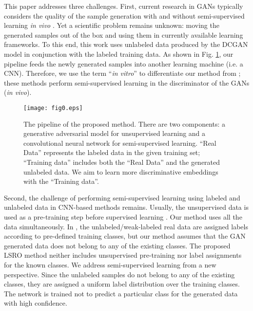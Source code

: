 \documentclass[10pt,twocolumn,letterpaper]{article}
\begin{document}
This paper addresses three challenges. First, current research in GANs typically considers the quality of the sample generation with and without semi-supervised learning \emph{in vivo} \cite{odena2016semi,salimans2016improved,radford2015unsupervised,chen2016infogan,pathak2016context,wu2016learning}. Yet a scientific problem remains unknown: moving the generated samples out of the box and using them in currently available learning frameworks. To this end, this work uses unlabeled data produced by the DCGAN model \cite{radford2015unsupervised} in conjunction with the labeled training data. As shown in Fig. \ref{fig:pipeline}, our pipeline feeds the newly generated samples into another learning machine (i.e. a CNN). Therefore, we use the term ``\emph{in vitro}'' to differentiate our method from \cite{odena2016semi,salimans2016improved,radford2015unsupervised,chen2016infogan}; these methods perform semi-supervised learning in the discriminator of the GANs (\emph{in vivo}).

\begin{figure}[t]
\begin{center}
\texttt{[image: fig0.eps]}
\end{center}
   \caption{The pipeline of the proposed method. There are two components: a generative adversarial model \cite{radford2015unsupervised} for unsupervised learning and a convolutional neural network for semi-supervised learning. ``Real Data'' represents the labeled data in the given training set; ``Training data'' includes both the ``Real Data'' and the generated unlabeled data. We aim to learn more discriminative embeddings with the ``Training data''. }
\label{fig:pipeline}
\end{figure}

Second, the challenge of performing semi-supervised learning using labeled and unlabeled data in CNN-based methods remains. Usually, the unsupervised data is used as a pre-training step before supervised learning \cite{ranzato2008semi,goodfellow2013multi,hinton2006reducing}. Our method uses all the data simultaneously. In \cite{papandreou2015weakly,lee2013pseudo,odena2016semi,salimans2016improved}, the unlabeled/weak-labeled real data are assigned labels according to pre-defined training classes, but our method assumes that the GAN generated data does not belong to any of the existing classes. The proposed LSRO method neither includes unsupervised pre-training nor label assignments for the known classes. We address semi-supervised learning from a new perspective. Since the unlabeled samples do not belong to any of the existing classes, they are assigned a uniform label distribution over the training classes. The network is trained not to predict a particular class for the generated data with high confidence.
\end{document}
